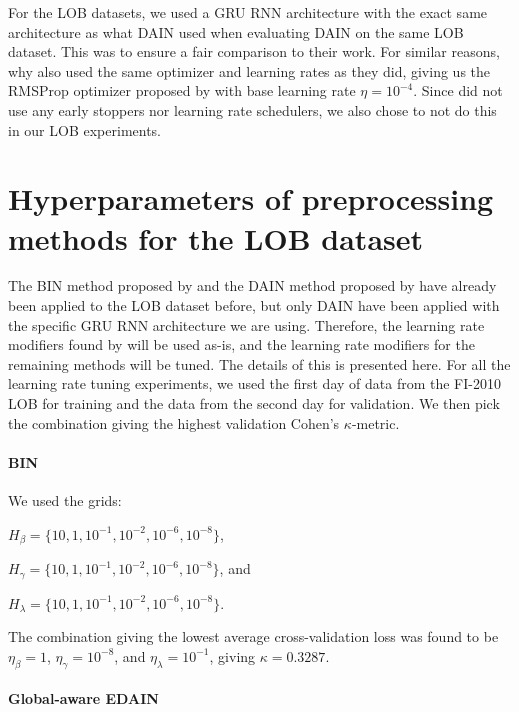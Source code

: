 \documentclass{statsmsc}
\begin{document}
{For the \ac{LOB} datasets, we used a \ac{GRU} \ac{RNN} architecture with the exact
same architecture as what \ac{DAIN} used when evaluating \ac{DAIN} on the same \ac{LOB} dataset.
This was to ensure a fair comparison to their work. For similar reasons, why also used the same
optimizer and learning rates as they did, giving us the RMSProp optimizer proposed by \cite{rmsprop}
with base learning rate $\eta=10^{-4}$. Since \cite{dain} did not use any early stoppers nor
learning rate schedulers, we also chose to not do this in our \ac{LOB} experiments.

\section{Hyperparameters of preprocessing methods for the LOB dataset}%
\label{sec:hyp_lob_prep}

The \ac{BIN} method proposed by \cite{bin} and the \ac{DAIN} method proposed by \cite{dain} have
already been applied to the \ac{LOB} dataset before, but only \ac{DAIN} have been applied
with the specific \ac{GRU} \ac{RNN} architecture we are using. Therefore, the learning rate
modifiers found by \cite{dain} will be used as-is, and the learning rate modifiers for
the remaining methods will be tuned. The details of this is presented here.
For all the learning rate tuning experiments, we used the first day of data from the FI-2010
\ac{LOB} for training and the data from the second day for validation. We then pick the
combination giving the highest validation Cohen's $\kappa$-metric.

\paragraph{BIN}

We used the grids:

$H_{\beta}=\{10,1,10^{-1},10^{-2},10^{-6},10^{-8}\}$,

$H_{\gamma}=\{10,1,10^{-1},10^{-2},10^{-6}, 10^{-8}\}$, and

$H_{\lambda}=\{10,1,10^{-1},10^{-2},10^{-6},10^{-8}\}$.

The combination giving the lowest average cross-validation loss was found to be
$\eta_\beta=1$, $\eta_\gamma=10^{-8}$, and $\eta_\lambda=10^{-1}$, giving $\kappa=0.3287$.

\paragraph{Global-aware EDAIN}%

}
\end{document}
